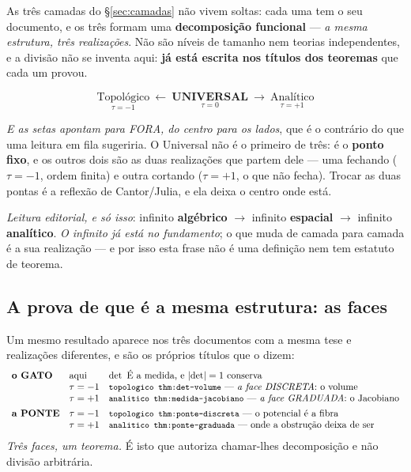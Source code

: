 \documentclass[11pt,a4paper]{article}
\newcommand{\code}[1]{\texttt{\small #1}}
\newcommand{\abs}[1]{\lvert #1\rvert}
\begin{document}
As três camadas do \S\ref{sec:camadas} não vivem soltas: cada uma tem o seu documento, e
os três formam uma \textbf{decomposição funcional} --- \emph{a mesma estrutura, três
realizações}. Não são níveis de tamanho nem teorias independentes, e a divisão não se
inventa aqui: \textbf{já está escrita nos títulos dos teoremas} que cada um provou.

\[
\boxed{\;\underset{\tau=-1}{\text{Topológico}}\ \longleftarrow\ \underset{\tau=0}{\textbf{UNIVERSAL}}\ \longrightarrow\ \underset{\tau=+1}{\text{Analítico}}\;}
\]

\noindent\emph{E as setas apontam para FORA, do centro para os lados}, que é o contrário
do que uma leitura em fila sugeriria. O Universal não é o primeiro de três: é o
\textbf{ponto fixo}, e os outros dois são as duas realizações que partem dele --- uma
fechando ($\tau=-1$, ordem finita) e outra cortando ($\tau=+1$, o que não fecha). Trocar as
duas pontas é a reflexão de Cantor/Julia, e ela deixa o centro onde está.

\noindent\emph{Leitura editorial, e só isso}: infinito \textbf{algébrico}
$\to$ infinito \textbf{espacial} $\to$ infinito \textbf{analítico}. \emph{O infinito já
está no fundamento}; o que muda de camada para camada é a sua realização --- e por isso
esta frase não é uma definição nem tem estatuto de teorema.

\subsection*{A prova de que é a mesma estrutura: as faces}

Um mesmo resultado aparece nos três documentos com a mesma tese e realizações
diferentes, e são os próprios títulos que o dizem:
\[
\begin{array}{lll}
\textbf{o GATO} & \text{aqui} & \det\ \text{É a medida, e }\abs{\det}=1\text{ conserva}\\
 & \tau=-1 & \code{topologico thm:det-volume} \text{ --- \emph{a face DISCRETA}: o volume}\\
 & \tau=+1 & \code{analitico thm:medida-jacobiano} \text{ --- \emph{a face GRADUADA}: o Jacobiano}\\[4pt]
\textbf{a PONTE} & \tau=-1 & \code{topologico thm:ponte-discreta} \text{ --- o potencial é a fibra}\\
 & \tau=+1 & \code{analitico thm:ponte-graduada} \text{ --- onde a obstrução deixa de ser}
\end{array}
\]
\emph{Três faces, um teorema.} É isto que autoriza chamar-lhes decomposição e não divisão
arbitrária.
\end{document}
